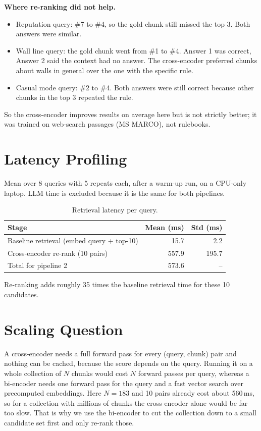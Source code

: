 ﻿\documentclass[11pt]{article}
\begin{document}
\noindent\textbf{Where re-ranking did not help.}
\begin{itemize}
\item Reputation query: \#7 to \#4, so the gold chunk still missed the top 3. Both answers were similar.
\item Wall line query: the gold chunk went from \#1 to \#4. Answer 1 was correct, Answer 2 said the context had no answer. The cross-encoder preferred chunks about walls in general over the one with the specific rule.
\item Casual mode query: \#2 to \#4. Both answers were still correct because other chunks in the top 3 repeated the rule.
\end{itemize}
So the cross-encoder improves results on average here but is not strictly better; it was trained on web-search passages (MS MARCO), not rulebooks.

\section{Latency Profiling}
Mean over 8 queries with 5 repeats each, after a warm-up run, on a CPU-only laptop. LLM time is excluded because it is the same for both pipelines.

\begin{table}[H]
\centering
\begin{tabular}{lrr}
\toprule
Stage & Mean (ms) & Std (ms) \\
\midrule
Baseline retrieval (embed query + top-10) & 15.7 & 2.2 \\
Cross-encoder re-rank (10 pairs) & 557.9 & 195.7 \\
Total for pipeline 2 & 573.6 & -- \\
\bottomrule
\end{tabular}
\caption{Retrieval latency per query.}
\end{table}

Re-ranking adds roughly 35 times the baseline retrieval time for these 10 candidates.

\section{Scaling Question}
A cross-encoder needs a full forward pass for every (query, chunk) pair and nothing can be cached, because the score depends on the query. Running it on a whole collection of $N$ chunks would cost $N$ forward passes per query, whereas a bi-encoder needs one forward pass for the query and a fast vector search over precomputed embeddings. Here $N=183$ and 10 pairs already cost about 560\,ms, so for a collection with millions of chunks the cross-encoder alone would be far too slow. That is why we use the bi-encoder to cut the collection down to a small candidate set first and only re-rank those.
\end{document}
